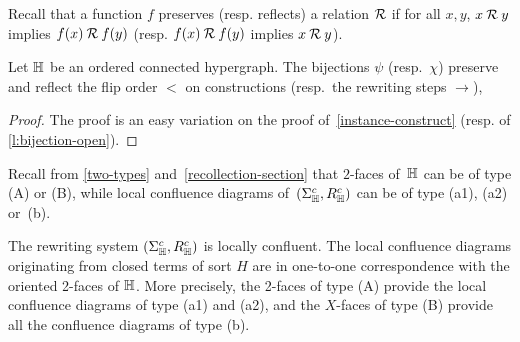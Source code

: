 Recall that a function $f$ preserves (resp. reflects) a relation  ${\cal R}$ if for all $x,y$, $x\:{\cal R}\:y$ implies $f(x)\:{\cal R}\: f(y)$ (resp.  $f(x)\:{\cal R} \:f(y)$ implies
$x\:{\cal R}\:y$).

\begin{lemma} \label{face-flip}
  Let ${\mathbb H}$ be an ordered connected hypergraph. 
  The bijections $\psi$ (resp.\ $\chi$) preserve and reflect the flip order $<$ on constructions (resp.\ the rewriting steps $\to$),
\end{lemma}
\begin{proof} 
  The proof is an easy variation on the proof of~\cref{instance-construct} (resp. of  \cref{l:bijection-open}).
\end{proof}

Recall from \cref{two-types} and~\cref{recollection-section} that $2$-faces of~${\mathbb H}$ can be of type (A) or (B), while local confluence diagrams of~$(\Sigma_{\mathbb H}^c,R_{\mathbb H}^c)$ can be of type (a1), (a2) or~(b).

\begin{theorem}
  \label{thm:critical-pairs} 
  The rewriting system $(\Sigma_{\mathbb H}^c,R_{\mathbb H}^c)$ is locally confluent. The local confluence diagrams originating from  closed terms of  sort $H$ are in one-to-one correspondence with the oriented 2-faces of ${\mathbb H}$.
  More precisely, the 2-faces of type (A) provide the local confluence diagrams of type (a1) and (a2),  and the $X$-faces of type (B) provide all the confluence diagrams of type (b).
\end{theorem}

